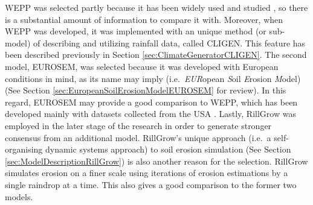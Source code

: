 WEPP was selected partly because it has been widely used and studied
\citep{zhang1996-855,baffaut1998-756,favis-mortlock1999-329,pruski2002-climate,
pruski2002-7,flanagan2007-1603}, so there is a substantial amount of
information to compare it with. Moreover, when WEPP was developed, it was
implemented with an unique method (or sub-model) of describing and utilizing
rainfall data, called CLIGEN. This feature has been described previously in
Section \ref{sec:ClimateGeneratorCLIGEN}. The second model, EUROSEM, was
selected because it was developed with European conditions in mind, as its name
may imply (i.e.\ \emph{EUR}opean \emph{S}oil \emph{E}rosion \emph{M}odel) (See
Section \ref{sec:EuropeanSoilErosionModelEUROSEM} for review). In this regard,
EUROSEM may provide a good comparison to WEPP, which has been developed mainly
with datasets collected from the USA \citep{flanagan2007-1603}. Lastly, RillGrow
was employed in the later stage of the research in order to generate stronger
consensus from an additional model. RillGrow's unique approach (i.e.\ a
self-organising dynamic systems approach) to soil erosion simulation (See
Section \ref{sec:ModelDescriptionRillGrow}) is also another reason for the
selection. RillGrow simulates erosion on a finer scale using iterations of
erosion estimations by a single raindrop at a time. This also gives a good
comparison to the former two models.


